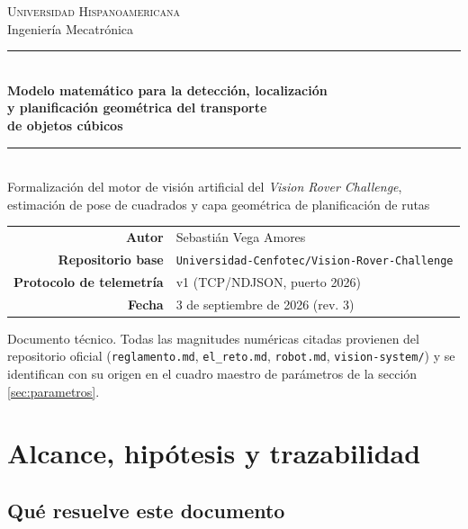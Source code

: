 \documentclass[11pt,a4paper]{article}
\theoremstyle{definition}
\begin{document}
\begin{titlepage}
\centering
\vspace*{2.2cm}
{\Large\scshape Universidad Hispanoamericana}\\[0.2cm]
{\large Ingeniería Mecatrónica}\\[2.4cm]

\rule{\linewidth}{1.2pt}\\[0.45cm]
{\LARGE\bfseries Modelo matemático para la detección, localización\\[0.18cm]
y planificación geométrica del transporte\\[0.18cm]
de objetos cúbicos}\\[0.45cm]
\rule{\linewidth}{1.2pt}\\[0.9cm]

{\large Formalización del motor de visión artificial del \textit{Vision Rover Challenge},\\
estimación de pose de cuadrados y capa geométrica de planificación de rutas}\\[2.6cm]

\begin{tabular}{rl}
\textbf{Autor} & Sebastián Vega Amores\\[0.15cm]
\textbf{Repositorio base} & \texttt{Universidad-Cenfotec/Vision-Rover-Challenge}\\[0.15cm]
\textbf{Protocolo de telemetría} & v1 (TCP/NDJSON, puerto 2026)\\[0.15cm]
\textbf{Fecha} & 3 de septiembre de 2026 (rev. 3)\\
\end{tabular}

\vfill
{\small Documento técnico. Todas las magnitudes numéricas citadas provienen del repositorio
oficial (\texttt{reglamento.md}, \texttt{el\_reto.md}, \texttt{robot.md},
\texttt{vision-system/}) y se identifican con su origen en el cuadro maestro de
parámetros de la sección \ref{sec:parametros}.}
\end{titlepage}

\tableofcontents
\newpage

\section{Alcance, hipótesis y trazabilidad}

\subsection{Qué resuelve este documento}
\end{document}
